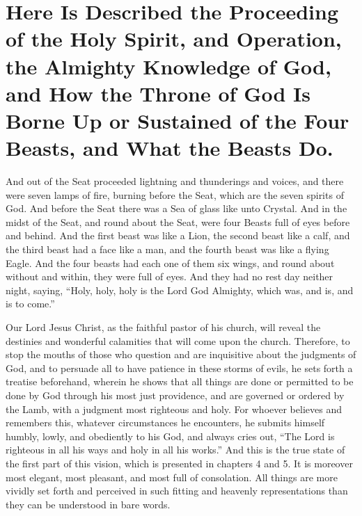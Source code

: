 \chapter[Sermon 24. Here Is Described the Proceeding of the Holy Spirit, and Operation, the Almighty Knowledge of God, and How the Throne of God Is Borne Up or Sustained of the Four Beasts, and What the Beasts Do.]{Here Is Described the Proceeding of the Holy Spirit, and Operation, the Almighty Knowledge of God, and How the Throne of God Is Borne Up or Sustained of the Four Beasts, and What the Beasts Do.}
\label{sermon:024}

And out of the Seat proceeded lightning and thunderings and voices, and there were seven lamps of fire, burning before the Seat, which are the seven spirits of God. And before the Seat there was a Sea of glass like unto Crystal. And in the midst of the Seat, and round about the Seat, were four Beasts full of eyes before and behind. And the first beast was like a Lion, the second beast like a calf, and the third beast had a face like a man, and the fourth beast was like a flying Eagle. And the four beasts had each one of them six wings, and round about without and within, they were full of eyes. And they had no rest day neither night, saying, “Holy, holy, holy is the Lord God Almighty, which was, and is, and is to come.”

Our Lord Jesus Christ, as the faithful pastor of his church, will reveal the destinies and wonderful calamities that will come upon the church. Therefore, to stop the mouths of those who question and are inquisitive about the judgments of God, and to persuade all to have patience in these storms of evils, he sets forth a treatise beforehand, wherein he shows that all things are done or permitted to be done by God through his most just providence, and are governed or ordered by the Lamb, with a judgment most righteous and holy. For whoever believes and remembers this, whatever circumstances he encounters, he submits himself humbly, lowly, and obediently to his God, and always cries out, “The Lord is righteous in all his ways and holy in all his works.” And this is the true state of the first part of this vision, which is presented in chapters 4 and 5. It is moreover most elegant, most pleasant, and most full of consolation. All things are more vividly set forth and perceived in such fitting and heavenly representations than they can be understood in bare words.

